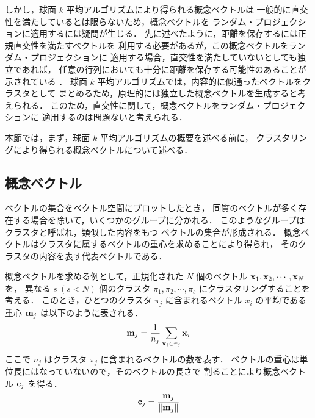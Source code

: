 しかし，球面 $k$ 平均アルゴリズムにより得られる概念ベクトルは
一般的に直交性を満たしているとは限らないため，概念ベクトルを
ランダム・プロジェクションに適用するには疑問が生じる．
先に述べたように，距離を保存するには正規直交性を満たすベクトルを
利用する必要があるが，この概念ベクトルをランダム・プロジェクションに
適用する場合，直交性を満たしていないとしても独立であれば，
任意の行列においても十分に距離を保存する可能性のあることが示されている
\cite{Arriaga}．
球面 $k$ 平均アルゴリズムでは，内容的に似通ったベクトルをクラスタとして
まとめるため，原理的には独立した概念ベクトルを生成すると考えられる．
このため，直交性に関して，概念ベクトルをランダム・プロジェクションに
適用するのは問題ないと考えられる．

本節では，まず，球面 $k$ 平均アルゴリズムの概要を述べる前に，
クラスタリングにより得られる概念ベクトルについて述べる．

\subsection{概念ベクトル}
ベクトルの集合をベクトル空間にプロットしたとき，
同質のベクトルが多く存在する場合を除いて，いくつかのグループに分かれる．
このようなグループはクラスタと呼ばれ，類似した内容をもつ
ベクトルの集合が形成される．
概念ベクトルはクラスタに属するベクトルの重心を求めることにより得られ，
そのクラスタの内容を表す代表ベクトルである．

概念ベクトルを求める例として，正規化された $N$ 個のベクトル 
${\bf x}_1, {\bf x}_2, \cdots , {\bf x}_N$ を，
異なる $s\ (s < N)$ 個のクラスタ $\pi_1, \pi_2, \cdots , \pi_s$ 
にクラスタリングすることを考える．
このとき，ひとつのクラスタ $\pi_j$ に含まれるベクトル $x_i$ の平均である
重心 ${\bf m}_j$ は以下のように表される．
\begin{equation}
{\bf m}_j = \frac{1}{n_j} \sum_{{\bf x}_i \in \pi_j} {\bf x}_i
\end{equation}
ここで $n_j$ はクラスタ $\pi_j$ に含まれるベクトルの数を表す．
ベクトルの重心は単位長にはなっていないので，そのベクトルの長さで
割ることにより概念ベクトル ${\bf c}_j$ を得る．
\begin{equation}
{\bf c}_j = \frac{{\bf m}_j}{\| {\bf m}_j \|}
\end{equation}

